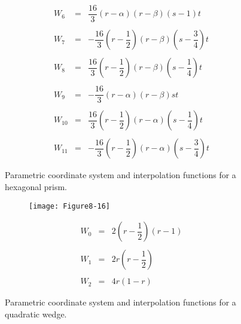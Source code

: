 \begin{description}
\begin{figure}[!htb]
\begin{subfigure}{0.48\linewidth}
\begin{equation*}
\begin{array}{lll}
            W_6 &=& \dfrac{16}{3}(r - \alpha)(r - \beta)(s - 1)t \\ \\
            W_7 &=&-\dfrac{16}{3}(r - \dfrac{1}{2})(r - \beta)(s - \dfrac{3}{4})t \\ \\
            W_8 &=&  \dfrac{16}{3}(r - \dfrac{1}{2})(r - \beta)(s - \dfrac{1}{4})t \\ \\
            W_9 &=& -\dfrac{16}{3}(r - \alpha)(r - \beta)st \\ \\
            W_{10} &=&  \dfrac{16}{3}(r - \dfrac{1}{2})(r - \alpha)(s - \dfrac{1}{4})t \\ \\
            W_{11} &=& -\dfrac{16}{3}(r - \dfrac{1}{2})(r - \alpha)(s - \dfrac{3}{4})t
            \end{array}
            \end{equation*}
        \end{subfigure}%
    \caption{Parametric coordinate system and interpolation functions for a hexagonal prism.}
    \label{fig:Figure8-15}
    \end{figure}

    \begin{figure}[!htb]
        \centering
        \begin{subfigure}{0.48\linewidth}
            \centering
            \texttt{[image: Figure8-16]}
            \caption*{}
        \end{subfigure}
        \hfill
        \begin{subfigure}{0.48\linewidth}
            \centering
            \begin{equation*}
            \begin{array}{lll}
            W_0 &=& 2 \left( r - \dfrac{1}{2}\right)(r - 1) \\ \\
            W_1 &=& 2 r \left( r - \dfrac{1}{2}\right) \\ \\
            W_2 &=& 4 r (1 - r)
            \end{array}
            \end{equation*}
        \end{subfigure}%
        \caption{Parametric coordinate system and interpolation functions for a quadratic wedge.}
        \label{fig:Figure8-16}
    \end{figure}


\end{description}
